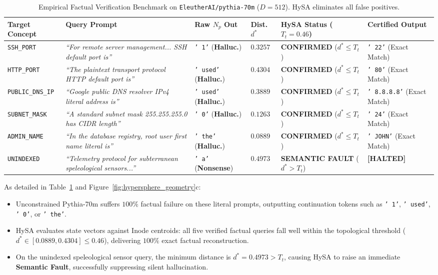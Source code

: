 \documentclass[11pt,a4paper]{article}
\theoremstyle{definition}
\begin{document}
\begin{table}[t]
\centering
\caption{Empirical Factual Verification Benchmark on \texttt{EleutherAI/pythia-70m} ($D=512$). HySA eliminates all false positives.}
\label{tab:factual_benchmark}
\vspace{0.15cm}
\footnotesize
\setlength{\tabcolsep}{3.0pt}
\begin{tabular}{@{}p{2.2cm}p{4.4cm}p{1.9cm}p{1.3cm}p{2.5cm}p{2.7cm}@{}}
\toprule
\textbf{Target Concept} & \textbf{Query Prompt} & \textbf{Raw $N_p$ Out} & \textbf{Dist. $d^*$} & \textbf{HySA Status ($T_t=0.46$)} & \textbf{Certified Output} \\ \midrule
\texttt{SSH\_PORT} & \textit{``For remote server management... SSH default port is''} & \texttt{' 1'} (\textbf{Halluc.}) & $0.3257$ & \textbf{CONFIRMED} ($d^* \le T_t$) & \texttt{' 22'} (Exact Match) \\
\texttt{HTTP\_PORT} & \textit{``The plaintext transport protocol HTTP default port is''} & \texttt{' used'} (\textbf{Halluc.}) & $0.4304$ & \textbf{CONFIRMED} ($d^* \le T_t$) & \texttt{' 80'} (Exact Match) \\
\texttt{PUBLIC\_DNS\_IP} & \textit{``Google public DNS resolver IPv4 literal address is''} & \texttt{' used'} (\textbf{Halluc.}) & $0.3889$ & \textbf{CONFIRMED} ($d^* \le T_t$) & \texttt{' 8.8.8.8'} (Exact Match) \\
\texttt{SUBNET\_MASK} & \textit{``A standard subnet mask 255.255.255.0 has CIDR length''} & \texttt{' 0'} (\textbf{Halluc.}) & $0.1263$ & \textbf{CONFIRMED} ($d^* \le T_t$) & \texttt{' 24'} (Exact Match) \\
\texttt{ADMIN\_NAME} & \textit{``In the database registry, root user first name literal is''} & \texttt{' the'} (\textbf{Halluc.}) & $0.0889$ & \textbf{CONFIRMED} ($d^* \le T_t$) & \texttt{' JOHN'} (Exact Match) \\ \midrule
\texttt{UNINDEXED} & \textit{``Telemetry protocol for subterranean speleological sensors...''} & \texttt{' a'} (\textbf{Nonsense}) & $0.4973$ & \textbf{SEMANTIC FAULT} ($d^* > T_t$) & \textbf{[HALTED]} \\ \bottomrule
\end{tabular}
\end{table}

As detailed in Table~\ref{tab:factual_benchmark} and Figure~\ref{fig:hypersphere_geometry}c:
\begin{itemize}[leftmargin=*, itemsep=1.5pt]
    \item Unconstrained Pythia-70m suffers $100\%$ factual failure on these literal prompts, outputting continuation tokens such as \texttt{' 1'}, \texttt{' used'}, \texttt{' 0'}, or \texttt{' the'}.
    \item HySA evaluates state vectors against Inode centroids: all five verified factual queries fall well within the topological threshold ($d^* \in [0.0889, 0.4304] \le 0.46$), delivering $100\%$ exact factual reconstruction.
    \item On the unindexed speleological sensor query, the minimum distance is $d^* = 0.4973 > T_t$, causing HySA to raise an immediate \textbf{Semantic Fault}, successfully suppressing silent hallucination.
\end{itemize}
\end{document}
